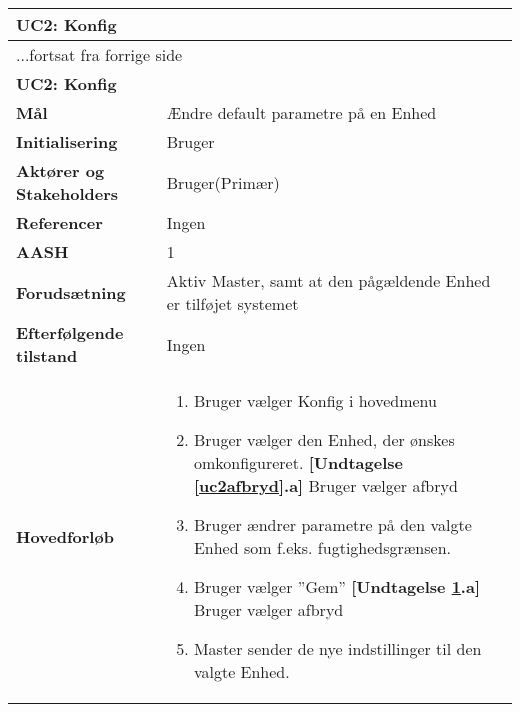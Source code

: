 \begin{center} \centering \label{UC2}
	\begin{longtable}{|p{5cm}|p{9cm}|}  %
	\hline
		\multicolumn{2}{|l|}{\textbf{UC2: Konfig}} \\\hline %
		\endfirsthead
		
		\multicolumn{2}{l}{...fortsat fra forrige side} \\ \hline %
		\multicolumn{2}{|l|}{\textbf{UC2: Konfig}} \\\hline %
		\endhead	
		
		\textbf{Mål}								&Ændre default parametre på en Enhed			\\\hline
		\textbf{Initialisering}					&Bruger							\\\hline
		\textbf{Aktører og Stakeholders}			&Bruger(Primær)					\\\hline
		\textbf{Referencer}						&Ingen							\\\hline
		\textbf{AASH}							&1								\\\hline
		\textbf{Forudsætning}					&Aktiv Master, samt at den pågældende Enhed er tilføjet systemet					\\\hline
		\textbf{Efterfølgende tilstand}			&Ingen							\\\hline
		\textbf{Hovedforløb}					
			&\begin{enumerate}
	
				\item Bruger vælger Konfig i hovedmenu
				
				\item \label{uc2afbryd}Bruger vælger den Enhed, der ønskes omkonfigureret.\newline
				\textbf{[Undtagelse \ref{uc2afbryd}.a]} \newline
					Bruger vælger afbryd
				
				\item Bruger ændrer parametre på den valgte Enhed som f.eks. fugtighedsgrænsen.
				
				\item \label{uc2afbryd2} Bruger vælger ''Gem''\newline
				\textbf{[Undtagelse \ref{uc2afbryd2}.a]} \newline
					Bruger vælger afbryd
				
				\item Master sender de nye indstillinger til den valgte Enhed. 
	

\end{enumerate}
\end{longtable}
\end{center}
